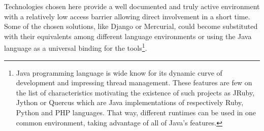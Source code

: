 Technologies chosen here provide a well documented and truly active environment with a relatively low access barrier allowing direct involvement in a short time. Some of the chosen solutions, like Django or Mercurial, could become substituted with their equivalents among different language environments or using the Java language as a universal binding for the tools\footnote{Java programming language is wide know for its dynamic curve of development and impressing thread management. These features are few on the list of characteristics motivating the existence of such projects as JRuby, Jython or Quercus which are Java implementations of respectively Ruby, Python and PHP languages. That way, different runtimes can be used in one common environment, taking advantage of all of Java’s features.}.      
\begin{figure}[ht]
  \begin{center}

\end{center}
\end{figure}
